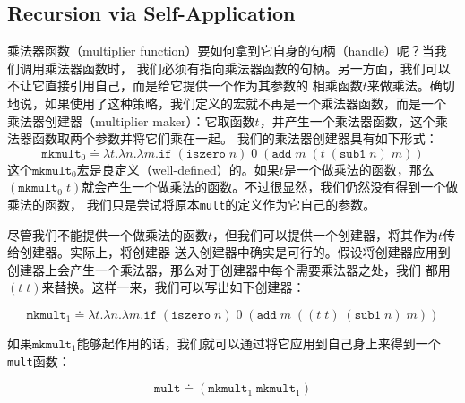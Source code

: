 \documentclass[12pt]{article}
\begin{document}
\subsection{Recursion via Self-Application}\label{ssec:RvSA}
\indent{}乘法器函数（multiplier function）要如何拿到它自身的句柄（handle）呢？当我们调用乘法器函数时，
我们必须有指向乘法器函数的句柄。另一方面，我们可以不让它直接引用自己，而是给它提供一个作为其参数的
相乘函数$t$来做乘法。确切地说，如果使用了这种策略，我们定义的宏就不再是一个乘法器函数，而是一个
乘法器创建器（multiplier maker）：它取函数$t$，并产生一个乘法器函数，这个乘法器函数取两个参数并将它们乘在一起。
我们的乘法器创建器具有如下形式：
\vspace{-0.5em}
\begin{displaymath}
\texttt{mkmult}_0 \doteq \lambda{}t.\lambda{}n.\lambda{}m.\texttt{if}\;
(\texttt{iszero}\;n)\;0\;(\texttt{add}\;m\;(t\;(\texttt{sub1}\;n)\;m))
\end{displaymath}
\noindent{}这个$\texttt{mkmult}_0$宏是良定义（well-defined）的。如果$t$是一个做乘法的函数，那么
$(\texttt{mkmult}_0\;t)$就会产生一个做乘法的函数。不过很显然，我们仍然没有得到一个做乘法的函数，
我们只是尝试将原本\texttt{mult}的定义作为它自己的参数。

\indent{}尽管我们不能提供一个做乘法的函数$t$，但我们可以提供一个创建器，将其作为$t$传给创建器。实际上，将创建器
送入创建器中确实是可行的。假设将创建器应用到创建器上会产生一个乘法器，那么对于创建器中每个需要乘法器之处，我们
都用$(t\;t)$来替换。这样一来，我们可以写出如下创建器：
\begin{tcolorbox}[top=-0.4em,left=0mm,right=0mm,bottom=1mm]
\begin{displaymath}
\texttt{mkmult}_1 \doteq \lambda{}t.\lambda{}n.\lambda{}m.\texttt{if}\;
(\texttt{iszero}\;n)\;0\;(\texttt{add}\;m\;((t\;t)\;(\texttt{sub1}\;n)\;m))
\end{displaymath}
\end{tcolorbox}
\noindent{}如果$\texttt{mkmult}_1$能够起作用的话，我们就可以通过将它应用到自己身上来得到一个\texttt{mult}函数：
\begin{tcolorbox}[top=-0.4em,left=0mm,right=0mm,bottom=1mm]
\begin{displaymath}
\texttt{mult} \doteq (\texttt{mkmult}_1\;\texttt{mkmult}_1)
\end{displaymath}
\end{tcolorbox}
\end{document}
